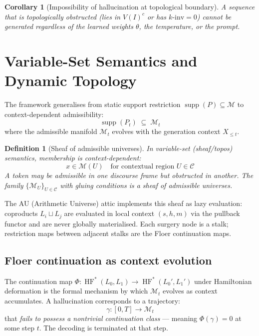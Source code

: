 \documentclass[11pt,a4paper]{article}
\newtheorem{corollary}[theorem]{Corollary}
\newtheorem{definition}[theorem]{Definition}
\DeclareMathOperator{\HF}{HF}
\DeclareMathOperator{\supp}{supp}
\newcommand{\Mfld}{\mathcal{M}}
\begin{document}
\begin{corollary}[Impossibility of hallucination at topological boundary]
A sequence that is topologically obstructed (lies in $V(I)^c$ or
has $k\text{-inv} = 0$) cannot be generated regardless of the
learned weights $\theta$, the temperature, or the prompt.
\end{corollary}

\section{Variable-Set Semantics and Dynamic Topology}

The framework generalises from static support restriction
$\supp(P) \subseteq \Mfld$ to context-dependent admissibility:
\[
  \supp(P_t) \;\subseteq\; \Mfld_t
\]
where the admissible manifold $\Mfld_t$ evolves with the
generation context $X_{\leq t}$.

\begin{definition}[Sheaf of admissible universes]
In variable-set (sheaf/topos) semantics, membership is
context-dependent:
\[
  x \in \Mfld(U) \quad\text{for contextual region } U \in \mathcal{C}
\]
A token may be admissible in one discourse frame but obstructed
in another. The family $\{\Mfld_U\}_{U \in \mathcal{C}}$ with
gluing conditions is a \emph{sheaf of admissible universes}.
\end{definition}

The AU (Arithmetic Universe) attic implements this sheaf as
lazy evaluation: coproducts $L_i \sqcup L_j$ are evaluated
in local context $(s,h,m)$ via the pullback functor and are
never globally materialised. Each surgery node is a stalk;
restriction maps between adjacent stalks are the Floer
continuation maps.

\subsection{Floer continuation as context evolution}

The continuation map $\Phi: \HF^*(L_0, L_1) \to \HF^*(L_0', L_1')$
under Hamiltonian deformation is the formal mechanism by which
$\Mfld_t$ evolves as context accumulates. A hallucination
corresponds to a trajectory:
\[
  \gamma: [0,T] \to \Mfld_t
\]
that \emph{fails to possess a nontrivial continuation class} ---
meaning $\Phi(\gamma) = 0$ at some step $t$. The decoding is
terminated at that step.
\end{document}
